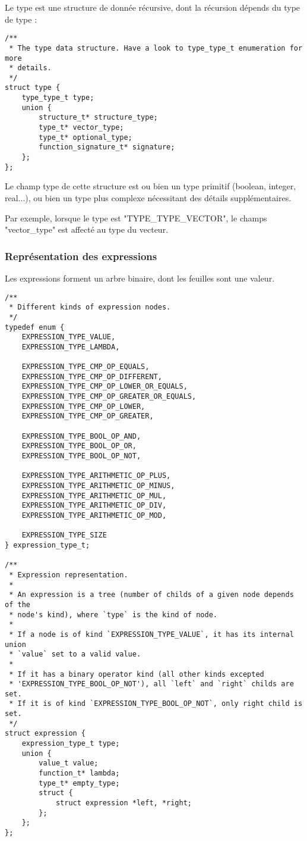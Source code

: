 Le type est une structure de donnée récursive, dont la récursion dépends du
type de type :
\begin{verbatim}
/**
 * The type data structure. Have a look to type_type_t enumeration for more
 * details.
 */
struct type {
    type_type_t type;
    union {
        structure_t* structure_type;
        type_t* vector_type;
        type_t* optional_type;
        function_signature_t* signature;
    };
};
\end{verbatim}

Le champ type de cette structure est ou bien un type primitif (boolean,
integer, real...), ou bien un type plus complexe nécessitant des détails
supplémentaires.

Par exemple, lorsque le type est "TYPE\_TYPE\_VECTOR", le champs "vector\_type"
est affecté au type du vecteur.

\subsubsection{Représentation des expressions}

Les expressions forment un arbre binaire, dont les feuilles sont une valeur.

\begin{verbatim}
/**
 * Different kinds of expression nodes.
 */
typedef enum {
    EXPRESSION_TYPE_VALUE,
    EXPRESSION_TYPE_LAMBDA,

    EXPRESSION_TYPE_CMP_OP_EQUALS,
    EXPRESSION_TYPE_CMP_OP_DIFFERENT,
    EXPRESSION_TYPE_CMP_OP_LOWER_OR_EQUALS,
    EXPRESSION_TYPE_CMP_OP_GREATER_OR_EQUALS,
    EXPRESSION_TYPE_CMP_OP_LOWER,
    EXPRESSION_TYPE_CMP_OP_GREATER,

    EXPRESSION_TYPE_BOOL_OP_AND,
    EXPRESSION_TYPE_BOOL_OP_OR,
    EXPRESSION_TYPE_BOOL_OP_NOT,

    EXPRESSION_TYPE_ARITHMETIC_OP_PLUS,
    EXPRESSION_TYPE_ARITHMETIC_OP_MINUS,
    EXPRESSION_TYPE_ARITHMETIC_OP_MUL,
    EXPRESSION_TYPE_ARITHMETIC_OP_DIV,
    EXPRESSION_TYPE_ARITHMETIC_OP_MOD,

    EXPRESSION_TYPE_SIZE
} expression_type_t;

/**
 * Expression representation.
 *
 * An expression is a tree (number of childs of a given node depends of the
 * node's kind), where `type` is the kind of node.
 *
 * If a node is of kind `EXPRESSION_TYPE_VALUE`, it has its internal union
 * `value` set to a valid value.
 *
 * If it has a binary operator kind (all other kinds excepted
 * 'EXPRESSION_TYPE_BOOL_OP_NOT'), all `left` and `right` childs are set.
 * If it is of kind `EXPRESSION_TYPE_BOOL_OP_NOT`, only right child is set.
 */
struct expression {
    expression_type_t type;
    union {
        value_t value;
        function_t* lambda;
        type_t* empty_type;
        struct {
            struct expression *left, *right;
        };
    };
};
\end{verbatim}


